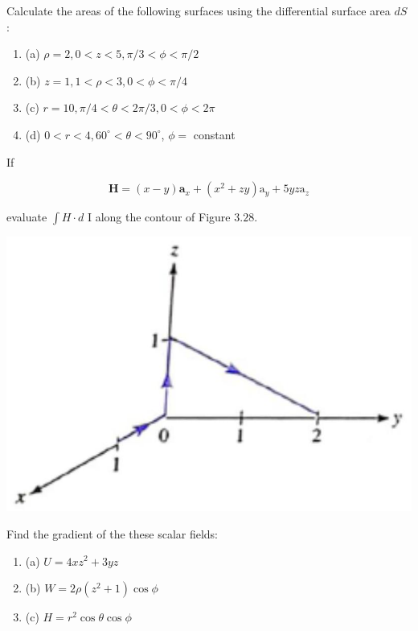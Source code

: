 \begin{problema}
    Calculate the areas of the following surfaces using the differential surface area $d S$ :

    \begin{enumerate}
        \item (a) $\rho=2,0<z<5, \pi / 3<\phi<\pi / 2$
        \item (b) $z=1,1<\rho<3,0<\phi<\pi / 4$
        \item (c) $r=10, \pi / 4<\theta<2 \pi / 3,0<\phi<2 \pi$
        \item (d) $0<r<4,60^{\circ}<\theta<90^{\circ}$, $\phi=$ constant
        
    \end{enumerate}

\end{problema}

\begin{problema}
    If

$$
\mathbf{H}=(x-y) \mathbf{a}_{x}+\left(x^{2}+z y\right) \mathrm{a}_{y}+5 y z \mathrm{a}_{z}
$$

evaluate $\int H \cdot d$ I along the contour of Figure $3.28$.
\begin{center}
    \includegraphics[scale=0.4]{Problemas/2023_02_02_45325701d3410451223eg-3.jpg}
    \end{center}

\end{problema}

\begin{problema}
    

    Find the gradient of the these scalar fields:
    \begin{enumerate}
        \item (a) $U=4 x z^{2}+3 y z$
        \item (b) $W=2 \rho\left(z^{2}+1\right) \cos \phi$
        \item (c) $H=r^{2} \cos \theta \cos \phi$
    \end{enumerate}

\end{problema}

